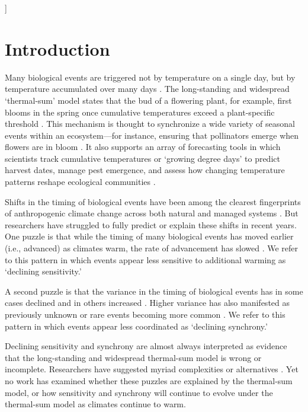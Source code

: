 \documentclass[
]{article}
\begin{document}
\vspace{2em}
]
{\renewcommand{\thefootnote}{\fnsymbol{footnote}}

\section{Introduction}\label{introduction}

Many biological events are triggered not by temperature on a single day, but by temperature accumulated over many days \citep{larcher1980}. The long-standing and widespread `thermal-sum' model states that the bud of a flowering plant, for example, first blooms in the spring once cumulative temperatures exceed a plant-specific threshold \citep{quetelet1849letters, chuinearees}. This mechanism is thought to synchronize a wide variety of seasonal events within an ecosystem---for instance, ensuring that pollinators emerge when flowers are in bloom  \citep{schwartzbook}. It also supports an array of forecasting tools in which scientists track cumulative temperatures or `growing degree days' to predict harvest dates, manage pest emergence, and assess how changing temperature patterns reshape ecological communities \citep{schwartzbook}.

Shifts in the timing of biological events have been among the clearest fingerprints of anthropogenic climate change across both natural and managed systems \citep{ipcc2022}. But researchers have struggled to fully predict or explain these shifts in recent years. One puzzle is that while the timing of many biological events has moved earlier (i.e., advanced) as climates warm, the rate of advancement has slowed \citep{fu2015declining}. We refer to this pattern in which events appear less sensitive to additional warming as `declining sensitivity.'

A second puzzle is that the variance in the timing of biological events has in some cases declined and in others increased \citep{vitasse2018global,stemkovski2023disorder}. Higher variance has also manifested as previously unknown or rare events becoming more common \citep{chuine2025living}. We refer to this pattern in which events appear less coordinated as `declining synchrony.'

Declining sensitivity and synchrony are almost always interpreted as evidence that the long-standing and widespread thermal-sum model is wrong or incomplete. Researchers have suggested myriad complexities or alternatives \citep{fu2015declining,wolkovich2021simple,gao2024thermal}. Yet no work has examined whether these puzzles are explained by the thermal-sum model, or how sensitivity and synchrony will continue to evolve under the thermal-sum model as climates continue to warm.

}
\end{document}
